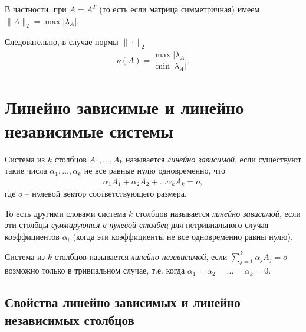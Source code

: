 \documentclass[%
	11pt,
	a4paper,
	utf8,
		]{article}
\begin{document}
В частности, при $ A = A^T $ (то есть если матрица симметричная) имеем $ \| A \|_2 = \max | \lambda_A | $.

Следовательно, в случае нормы $ \| \cdot \|_2 $
\begin{align*}
	\nu(A) = \dfrac{ \max | \lambda_A | }{ \min | \lambda_A | }.
\end{align*}


\section{Линейно зависимые и линейно независимые системы}

Система из $ k $ столбцов $ A_1, \ldots, A_k $ называется \emph{линейно зависимой}, если существуют такие числа $ \alpha_1, \ldots, \alpha_k $ не все равные нулю одновременно, что \cite[]{bortakovskiy:2005}
\begin{align*}
	\alpha_1 A_1 + \alpha_2 A_2 + \ldots \alpha_k A_k = o,
\end{align*}
где $ o $ -- нулевой вектор соответствующего размера.

То есть другими словами система $ k $ столбцов называется \emph{линейно зависимой}, если эти столбцы \emph{суммируются в нулевой столбец} для нетривиального случая коэффициентов $ \alpha_i $ (когда эти коэффициенты не все одновременно равны нулю).

Система из $ k $ столбцов называется \emph{линейно независимой}, если $ \sum\limits_{j=1}^k \alpha_j A_j = o $ возможно только в тривиальном случае, т.е. когда $ \alpha_1 = \alpha_2 = \ldots = \alpha_k = 0 $.

\subsection{Свойства линейно зависимых и линейно независимых столбцов}

\end{document}
